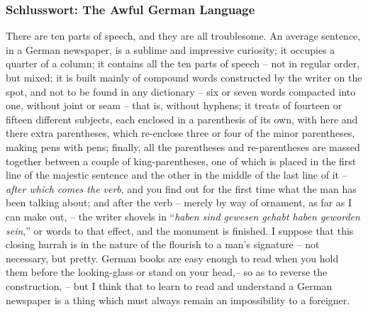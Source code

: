 \begin{frame}
\frametitle{Schlusswort: The Awful German Language}

\begin{scriptsize}

There are ten parts of speech, and they are all troublesome. An average sentence, in a German newspaper, is a sublime and impressive curiosity; it occupies a quarter of a column; it contains all the ten parts of speech -- not in regular order, but mixed; it is built mainly of compound words constructed by the writer on the spot, and not to be found in any dictionary -- six or seven words compacted into one, without joint or seam -- that is, without hyphens; it treats of fourteen or fifteen different subjects, each enclosed in a parenthesis of its own, with here and there extra parentheses, which re-enclose three or four of the minor parentheses, making pens with pens; finally, all the parentheses and re-parentheses are massed together between a couple of king-parentheses, one of which is placed in the first line of the majestic sentence and the other in the middle of the last line of it -- \emph{after which comes the verb}, and you find out for the first time what the man has been talking about; and after the verb -- merely by way of ornament, as far as I can make out, -- the writer shovels in ``\emph{haben sind gewesen gehabt haben geworden sein},'' or words to that effect, and the monument is finished. I suppose that this closing hurrah is in the nature of the flourish to a man's signature -- not necessary, but pretty. German books are easy enough to read when you hold them before the looking-glass or stand on your head,-- so as to reverse the construction, -- but I think that to learn to read and understand a German newspaper is a thing which must always remain an impossibility to a foreigner.

\hfill \citep{Twain10b}
\end{scriptsize}

\end{frame}
